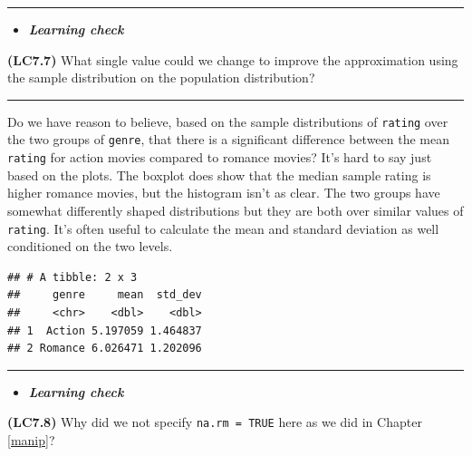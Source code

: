 \documentclass[]{tufte-book}
\newenvironment{Shaded}{\begin{snugshade}}{\end{snugshade}}
\newcommand{\KeywordTok}[1]{\textcolor[rgb]{0.13,0.29,0.53}{\textbf{{#1}}}}
\newcommand{\DataTypeTok}[1]{\textcolor[rgb]{0.13,0.29,0.53}{{#1}}}
\newcommand{\StringTok}[1]{\textcolor[rgb]{0.31,0.60,0.02}{{#1}}}
\newcommand{\NormalTok}[1]{{#1}}
\newenvironment{rmdblock}[1]
  {\begin{shaded*}
  \begin{itemize}
  \renewcommand{\labelitemi}{
    \raisebox{-.7\height}[0pt][0pt]{
    }
  }
  \item
  }
  {
  \end{itemize}
  \end{shaded*}
  }
\newenvironment{learncheck}
  {\begin{rmdblock}{warning}}
  {\end{rmdblock}}
\begin{document}
\begin{center}\rule{\linewidth}{\linethickness}\end{center}\begin{learncheck}
\textbf{\emph{Learning check}}
\end{learncheck}

\textbf{(LC7.7)} What single value could we change to improve the
approximation using the sample distribution on the population
distribution?

\begin{center}\rule{\linewidth}{\linethickness}\end{center}

Do we have reason to believe, based on the sample distributions of
\texttt{rating} over the two groups of \texttt{genre}, that there is a
significant difference between the mean \texttt{rating} for action
movies compared to romance movies? It's hard to say just based on the
plots. The boxplot does show that the median sample rating is higher
romance movies, but the histogram isn't as clear. The two groups have
somewhat differently shaped distributions but they are both over similar
values of \texttt{rating}. It's often useful to calculate the mean and
standard deviation as well conditioned on the two levels.

\begin{Shaded}
\end{Shaded}

\begin{verbatim}
## # A tibble: 2 x 3
##     genre     mean  std_dev
##     <chr>    <dbl>    <dbl>
## 1  Action 5.197059 1.464837
## 2 Romance 6.026471 1.202096
\end{verbatim}

\begin{center}\rule{\linewidth}{\linethickness}\end{center}\begin{learncheck}
\textbf{\emph{Learning check}}
\end{learncheck}

\textbf{(LC7.8)} Why did we not specify \texttt{na.rm\ =\ TRUE} here as
we did in Chapter \ref{manip}?
\end{document}
